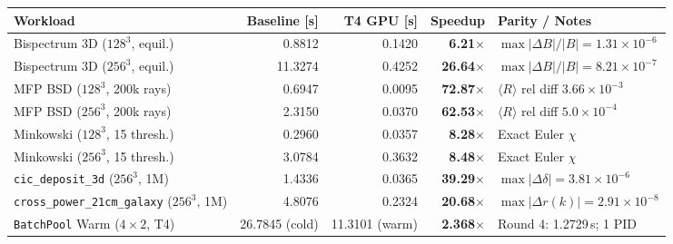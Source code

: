 \begin{tabular}{@{}lrrrl@{}}
\toprule
Workload & Baseline [s] & T4 GPU [s] & Speedup & Parity / Notes \\
\midrule
Bispectrum 3D ($128^3$, equil.) & 0.8812 & 0.1420 & \textbf{6.21$\times$} & $\max|\Delta B|/|B|=1.31\times 10^{-6}$ \\
Bispectrum 3D ($256^3$, equil.) & 11.3274 & 0.4252 & \textbf{26.64$\times$} & $\max|\Delta B|/|B|=8.21\times 10^{-7}$ \\
MFP BSD ($128^3$, 200k rays) & 0.6947 & 0.0095 & \textbf{72.87$\times$} & $\langle R\rangle$ rel diff $3.66\times 10^{-3}$ \\
MFP BSD ($256^3$, 200k rays) & 2.3150 & 0.0370 & \textbf{62.53$\times$} & $\langle R\rangle$ rel diff $5.0\times 10^{-4}$ \\
Minkowski ($128^3$, 15 thresh.) & 0.2960 & 0.0357 & \textbf{8.28$\times$} & Exact Euler $\chi$ \\
Minkowski ($256^3$, 15 thresh.) & 3.0784 & 0.3632 & \textbf{8.48$\times$} & Exact Euler $\chi$ \\
\texttt{cic\_deposit\_3d} ($256^3$, 1M) & 1.4336 & 0.0365 & \textbf{39.29$\times$} & $\max|\Delta\delta|=3.81\times 10^{-6}$ \\
\texttt{cross\_power\_21cm\_galaxy} ($256^3$, 1M) & 4.8076 & 0.2324 & \textbf{20.68$\times$} & $\max|\Delta r(k)|=2.91\times 10^{-8}$ \\
\texttt{BatchPool} Warm ($4\times 2$, T4) & 26.7845 (cold) & 11.3101 (warm) & \textbf{2.368$\times$} & Round 4: 1.2729\,s; 1 PID \\
\bottomrule
\end{tabular}
